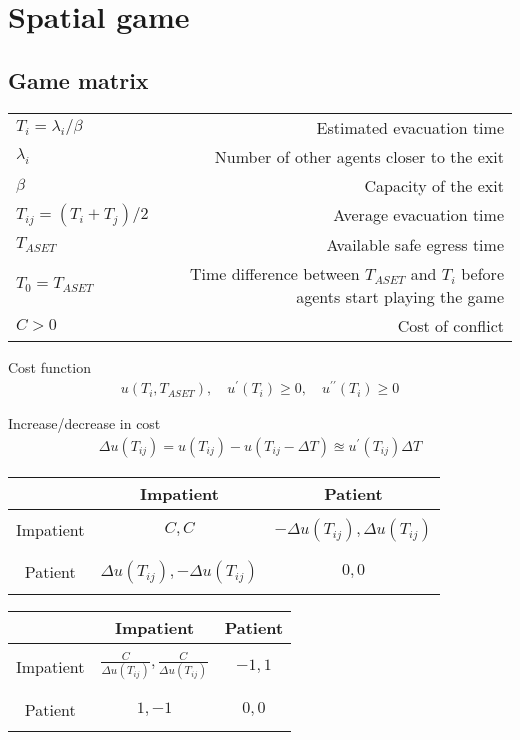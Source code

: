 \section{Spatial game}
\subsection{Game matrix}
\begin{tabularx}{1.0\linewidth}{ l R }
$ T_{i} = \lambda_{i} / \beta $ &  Estimated evacuation time \\
$ \lambda_{i} $ & Number of other agents closer to the exit \\
$ \beta $ & Capacity of the exit \\
$ T_{ij} = \left(T_{i} + T_{j}\right) / 2 $ & Average evacuation time \\
$ T_{ASET} $ & Available safe egress time \\
$ T_{0} = T_{ASET} $ & Time difference between $ T_{ASET} $ and $ T_{i} $ before agents start playing the game \\
$ C > 0 $ & Cost of conflict \\
\end{tabularx}


Cost function
\begin{align}
u(T_{i}, T_{ASET}), \quad u^{\prime}(T_{i}) \geq 0, \quad u^{\prime\prime}(T_{i}) \geq 0
\end{align}

Increase/decrease in cost
\begin{align}
\Delta u(T_{ij}) = u(T_{ij}) - u(T_{ij} - \Delta T) \approxeq u^{\prime}(T_{ij}) \Delta T
\end{align}


\begin{tabularx}{1.0\linewidth}{ c | C | C }
& Impatient & Patient \\
\hline
&& \\
Impatient & $ C, C $ & $ -\Delta u(T_{ij}), \Delta u(T_{ij}) $ \\
&& \\
\hline
&& \\
Patient & $ \Delta u(T_{ij}), -\Delta u(T_{ij}) $ & $ 0, 0 $ \\
&& \\
\end{tabularx}

\vspace{1.0cm}

\begin{tabularx}{1.0\linewidth}{ c | C | C }
& Impatient & Patient \\
\hline
&& \\
Impatient & $ \frac{C}{\Delta u(T_{ij})}, \frac{C}{\Delta u(T_{ij})} $ & $ -1, 1 $ \\
&& \\
\hline
&& \\
Patient & $ 1, -1 $ & $ 0, 0 $ \\
&& \\
\end{tabularx}

